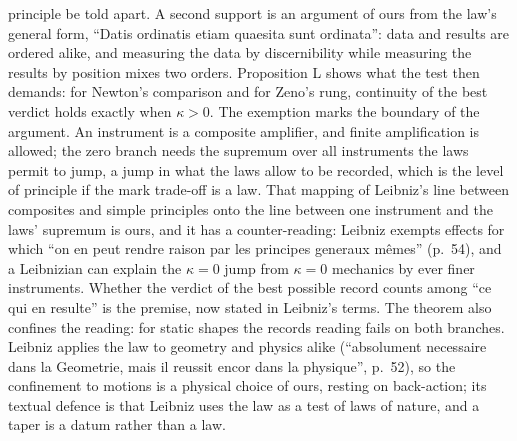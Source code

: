 \documentclass[11pt,a4paper]{article}
\begin{document}
\begin{itemize}
  principle be told apart. A second support is an argument of ours from
  the law's general form, ``Datis ordinatis etiam quaesita sunt
  ordinata'': data and results are ordered alike, and measuring the data
  by discernibility while measuring the results by position mixes two
  orders. Proposition L shows what the test then demands: for Newton's
  comparison and for Zeno's rung, continuity of the best verdict holds
  exactly when \(\kappa>0\). The exemption marks the boundary of the
  argument. An instrument is a composite amplifier, and finite
  amplification is allowed; the zero branch needs the supremum over all
  instruments the laws permit to jump, a jump in what the laws allow to
  be recorded, which is the level of principle if the mark trade-off is
  a law. That mapping of Leibniz's line between composites and simple
  principles onto the line between one instrument and the laws' supremum
  is ours, and it has a counter-reading: Leibniz exempts effects for
  which ``on en peut rendre raison par les principes generaux mêmes''
  (p.~54), and a Leibnizian can explain the \(\kappa=0\) jump from
  \(\kappa=0\) mechanics by ever finer instruments. Whether the verdict
  of the best possible record counts among ``ce qui en resulte'' is the
  premise, now stated in Leibniz's terms. The theorem also confines the
  reading: for static shapes the records reading fails on both branches.
  Leibniz applies the law to geometry and physics alike (``absolument
  necessaire dans la Geometrie, mais il reussit encor dans la
  physique'', p.~52), so the confinement to motions is a physical choice
  of ours, resting on back-action; its textual defence is that Leibniz
  uses the law as a test of laws of nature, and a taper is a datum
  rather than a law.
\end{itemize}
\end{document}
